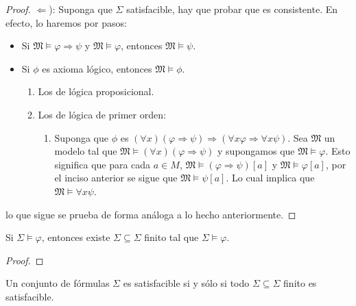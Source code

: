 \documentclass[12pt]{report}
\newcounter{it}
\theoremstyle{largebreak}
\begin{document}
\begin{proof}
        $\Leftarrow$): Suponga que $\Sigma$ satisfacible, hay que probar que es consistente. En efecto, lo haremos por pasos:
        \begin{itemize}
            \item Si $\mathfrak{M}\vDash\varphi\Rightarrow\psi$ y $\mathfrak{M}\vDash\varphi$, entonces $\mathfrak{M}\vDash\psi$.
            \item Si $\phi$ es axioma lógico, entonces $\mathfrak{M}\vDash\phi$.
            \begin{enumerate}[label = \textit{(\alph*)}]
                \item Los de lógica proposicional.
                \item Los de lógica de primer orden:
                \begin{enumerate}[label = \textit{(\arabic*)}]
                    \item Suponga que $\phi$ es $(\forall x)(\varphi\Rightarrow\psi)\Rightarrow (\forall x\varphi\Rightarrow\forall x\psi)$. Sea $\mathfrak{M}$ un modelo tal que $\mathfrak{M}\vDash(\forall x)(\varphi\Rightarrow\psi)$ y supongamos que $\mathfrak{M}\vDash\varphi$. Esto significa que para cada $a\in M$, $\mathfrak{M}\vDash(\varphi\Rightarrow\psi)[a]$ y $\mathfrak{M}\vDash\varphi[a]$, por el inciso anterior se sigue que $\mathfrak{M}\vDash\psi[a]$. Lo cual implica que $\mathfrak{M}\vDash\forall x\psi$.
                \end{enumerate}
            \end{enumerate}
        \end{itemize}
        lo que sigue se prueba de forma análoga a lo hecho anteriormente.
    \end{proof}

    \begin{cor}
        Si $\Sigma\vDash\varphi$, entonces existe $\Sigma\subseteq\Sigma$ finito tal que $\Sigma\vDash\varphi$.
    \end{cor}

    \begin{proof}
        
    \end{proof}

    \begin{cor}
        Un conjunto de fórmulas $\Sigma$ es satisfacible si y sólo si todo $\Sigma\subseteq\Sigma$ finito es satisfacible.
    \end{cor}
\end{document}
